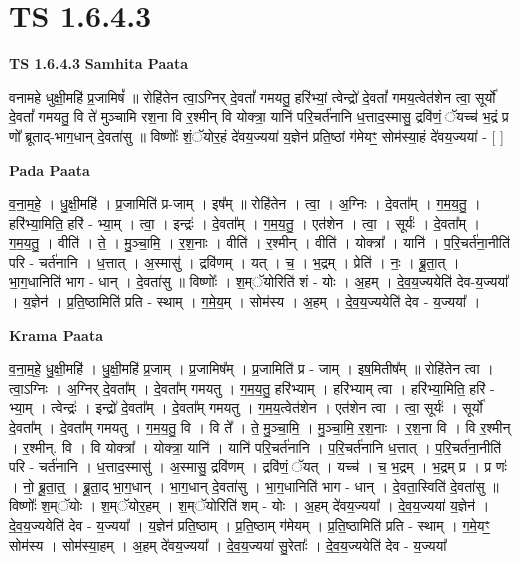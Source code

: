 \documentclass[17pt]{extarticle}
\begin{document}
\section*{ TS 1.6.4.3 }

\textbf{TS 1.6.4.3 } \newline
\textbf{Samhita Paata} \newline

वनामहे धुक्षी॒महि॑ प्र॒जामिषं᳚ ॥ रोहि॑तेन त्वा॒ऽग्निर् दे॒वतां᳚ गमयतु॒ हरि॑भ्यां॒ त्वेन्द्रो॑ दे॒वतां᳚ गमय॒त्वेत॑शेन त्वा॒ सूर्यो॑ दे॒वतां᳚ गमयतु॒ वि ते॑ मुञ्चामि रश॒ना वि र॒श्मीन् वि योक्त्रा॒ यानि॑ परि॒चर्त॑नानि ध॒त्ताद॒स्मासु॒ द्रवि॑णं॒ ॅयच्च॑ भ॒द्रं प्र णो᳚ ब्रूताद्-भाग॒धान् दे॒वता॑सु ॥ विष्णोः᳚ शं॒ॅयोर॒हं दे॑वय॒ज्यया॑ य॒ज्ञेन॑ प्रति॒ष्ठां ग॑मेयꣳ॒॒ सोम॑स्या॒हं दे॑वय॒ज्यया॑ - [ ] \newline

\textbf{Pada Paata} \newline

व॒ना॒म॒हे॒ । धु॒क्षी॒महि॑ । प्र॒जामिति॑ प्र-जाम् । इष᳚म् ॥ रोहि॑तेन । त्वा॒ । अ॒ग्निः । दे॒वता᳚म् । ग॒म॒य॒तु॒ । हरि॑भ्या॒मिति॒ हरि॑ - भ्या॒म् । त्वा॒ । इन्द्रः॑ । दे॒वता᳚म् । ग॒म॒य॒तु॒ । एत॑शेन । त्वा॒ । सूर्यः॑ । दे॒वता᳚म् । ग॒म॒य॒तु॒ । वीति॑ । ते॒ । मु॒ञ्चा॒मि॒ । र॒श॒नाः । वीति॑ । र॒श्मीन् । वीति॑ । योक्त्रा᳚ । यानि॑ । प॒रि॒चर्त॑ना॒नीति॑ परि - चर्त॑नानि । ध॒त्तात् । अ॒स्मासु॑ । द्रवि॑णम् । यत् । च॒ । भ॒द्रम् । प्रेति॑ । नः॒ । ब्रू॒ता॒त् । भा॒ग॒धानिति॑ भाग - धान् । दे॒वता॑सु ॥ विष्णोः᳚ । श॒म्ॅयोरिति॑ शं - योः । अ॒हम् । दे॒व॒य॒ज्ययेति॑ देव-य॒ज्यया᳚ । य॒ज्ञेन॑ । प्र॒ति॒ष्ठामिति॑ प्रति - स्थाम् । ग॒मे॒य॒म् । सोम॑स्य । अ॒हम् । दे॒व॒य॒ज्ययेति॑ देव - य॒ज्यया᳚ ।  \newline


\textbf{Krama Paata} \newline

व॒ना॒म॒हे॒ धु॒क्षी॒महि॑ । धु॒क्षी॒महि॑ प्र॒जाम् । प्र॒जामिष᳚म् । प्र॒जामिति॑ प्र - जाम् । इष॒मितीष᳚म् ॥ रोहि॑तेन त्वा । त्वा॒ऽग्निः । अ॒ग्निर् दे॒वता᳚म् । दे॒वता᳚म् गमयतु । ग॒म॒य॒तु॒ हरि॑भ्याम् । हरि॑भ्याम् त्वा । हरि॑भ्या॒मिति॒ हरि॑ - भ्या॒म् । त्वेन्द्रः॑ । इन्द्रो॑ दे॒वता᳚म् । दे॒वता᳚म् गमयतु । ग॒म॒य॒त्वेत॑शेन । एत॑शेन त्वा । त्वा॒ सूर्यः॑ । सूर्यो॑ दे॒वता᳚म् । दे॒वता᳚म् गमयतु । ग॒म॒य॒तु॒ वि । वि ते᳚ । ते॒ मु॒ञ्चा॒मि॒ । मु॒ञ्चा॒मि॒ र॒श॒नाः । र॒श॒ना वि । वि र॒श्मीन् । र॒श्मीन्. वि । वि योक्त्रा᳚ । योक्त्रा॒ यानि॑ । यानि॑ परि॒चर्त॑नानि । प॒रि॒चर्त॑नानि ध॒त्तात् । प॒रि॒चर्त॑ना॒नीति॑ परि - चर्त॑नानि । ध॒त्ताद॒स्मासु॑ । अ॒स्मासु॒ द्रवि॑णम् । द्रवि॑णं॒ ॅयत् । यच्च॑ । च॒ भ॒द्रम् । भ॒द्रम् प्र । प्र णः॑ । नो॒ ब्रू॒ता॒त्॒ । ब्रू॒ता॒द् भा॒ग॒धान् । भा॒ग॒धान् दे॒वता॑सु । भा॒ग॒धानिति॑ भाग - धान् । दे॒वता॒स्विति॑ दे॒वता॑सु ॥ विष्णोः᳚ श॒म्ॅयोः । श॒म्ॅयोर॒हम् । श॒म्ॅयोरिति॑ शम् - योः । अ॒हम् दे॑वय॒ज्यया᳚ । दे॒व॒य॒ज्यया॑ य॒ज्ञेन॑ । दे॒व॒य॒ज्ययेति॑ देव - य॒ज्यया᳚ । य॒ज्ञेन॑ प्रति॒ष्ठाम् । प्र॒ति॒ष्ठाम् ग॑मेयम् । प्र॒ति॒ष्ठामिति॑ प्रति - स्थाम् । ग॒मे॒यꣳ॒॒ सोम॑स्य । सोम॑स्या॒हम् । अ॒हम् दे॑वय॒ज्यया᳚ । दे॒व॒य॒ज्यया॑ सु॒रेताः᳚ । दे॒व॒य॒ज्ययेति॑ देव - य॒ज्यया᳚ \newline
\end{document}
